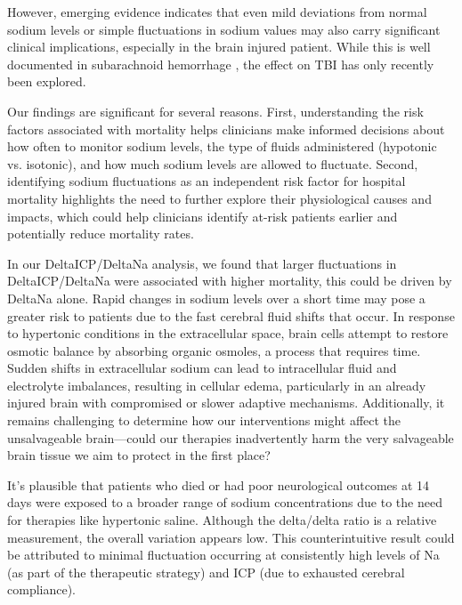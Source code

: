 However, emerging evidence\cite{darmonPrognosticConsequencesBorderline2013} indicates that even mild deviations from normal sodium levels or simple fluctuations in sodium values may also carry significant clinical implications, especially in the brain injured patient. While this is well documented in subarachnoid hemorrhage \cite{jinAssociationSerumSodium2022}\cite{labibSodiumItsImpact2024}\cite{balesEffectHyponatremiaSodium2016}\cite{topjianGreaterFluctuationsSerum2014}\cite{eaglesSignificanceFluctuationsSerum2019}\cite{haradaImpactHormonalDynamics2022}, the effect on TBI has only recently been explored\cite{harroisVariabilitySerumSodium2021a}.

Our findings are significant for several reasons. First, understanding the risk factors associated with mortality helps clinicians make informed decisions about how often to monitor sodium levels, the type of fluids administered (hypotonic vs. isotonic), and how much sodium levels are allowed to fluctuate. Second, identifying sodium fluctuations as an independent risk factor for hospital mortality highlights the need to further explore their physiological causes and impacts, which could help clinicians identify at-risk patients earlier and potentially reduce mortality rates.

In our DeltaICP/DeltaNa analysis, we found that larger fluctuations in DeltaICP/DeltaNa were associated with higher mortality, this could be driven by DeltaNa alone. Rapid changes in sodium levels over a short time may pose a greater risk to patients due to the fast cerebral fluid shifts that occur. In response to hypertonic conditions in the extracellular space, brain cells attempt to restore osmotic balance by absorbing organic osmoles, a process that requires time. Sudden shifts in extracellular sodium can lead to intracellular fluid and electrolyte imbalances, resulting in cellular edema, particularly in an already injured brain with compromised or slower adaptive mechanisms. Additionally, it remains challenging to determine how our interventions might affect the unsalvageable brain—could our therapies inadvertently harm the very salvageable brain tissue we aim to protect in the first place?

It’s plausible that patients who died or had poor neurological outcomes at 14 days were exposed to a broader range of sodium concentrations due to the need for therapies like hypertonic saline. Although the delta/delta ratio is a relative measurement, the overall variation appears low. This counterintuitive result could be attributed to minimal fluctuation occurring at consistently high levels of Na (as part of the therapeutic strategy) and ICP (due to exhausted cerebral compliance).

